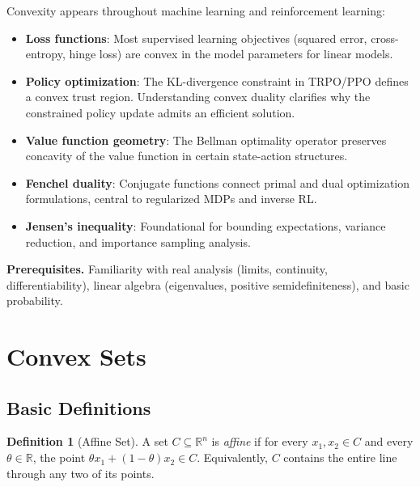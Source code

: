 \documentclass[11pt,a4paper]{article}
\theoremstyle{definition}
\newtheorem{definition}[theorem]{Definition}
\theoremstyle{remark}
\newcommand{\R}{\mathbb{R}}
\begin{document}
\begin{rlconnection}
Convexity appears throughout machine learning and reinforcement learning:
\begin{itemize}
  \item \textbf{Loss functions}: Most supervised learning objectives (squared error,
        cross-entropy, hinge loss) are convex in the model parameters for linear models.
  \item \textbf{Policy optimization}: The KL-divergence constraint in TRPO/PPO defines a
        convex trust region. Understanding convex duality clarifies why the constrained
        policy update admits an efficient solution.
  \item \textbf{Value function geometry}: The Bellman optimality operator preserves
        concavity of the value function in certain state-action structures.
  \item \textbf{Fenchel duality}: Conjugate functions connect primal and dual
        optimization formulations, central to regularized MDPs and inverse RL.
  \item \textbf{Jensen's inequality}: Foundational for bounding expectations, variance
        reduction, and importance sampling analysis.
\end{itemize}
\end{rlconnection}

\textbf{Prerequisites.} Familiarity with real analysis (limits, continuity,
differentiability), linear algebra (eigenvalues, positive semidefiniteness), and basic
probability.

\section{Convex Sets}

\subsection{Basic Definitions}

\begin{definition}[Affine Set]
\label{def:affine-set}
A set $C \subseteq \R^n$ is \emph{affine} if for every $x_1, x_2 \in C$ and every
$\theta \in \R$, the point $\theta x_1 + (1-\theta) x_2 \in C$. Equivalently, $C$
contains the entire line through any two of its points.
\end{definition}
\end{document}
